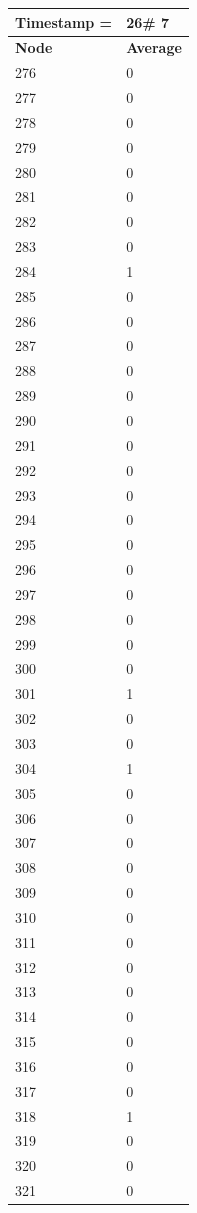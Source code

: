 \begin{tabular}{|l||l|}
\hline
\textbf{Timestamp =} & \textbf{26}\# 7\\\hline
	\textbf{Node} & \textbf{Average} \\ \hline
\hline
	276 & 0 \\ \hline
	277 & 0 \\ \hline
	278 & 0 \\ \hline
	279 & 0 \\ \hline
	280 & 0 \\ \hline
	281 & 0 \\ \hline
	282 & 0 \\ \hline
	283 & 0 \\ \hline
	284 & 1 \\ \hline
	285 & 0 \\ \hline
	286 & 0 \\ \hline
	287 & 0 \\ \hline
	288 & 0 \\ \hline
	289 & 0 \\ \hline
	290 & 0 \\ \hline
	291 & 0 \\ \hline
	292 & 0 \\ \hline
	293 & 0 \\ \hline
	294 & 0 \\ \hline
	295 & 0 \\ \hline
	296 & 0 \\ \hline
	297 & 0 \\ \hline
	298 & 0 \\ \hline
	299 & 0 \\ \hline
	300 & 0 \\ \hline
	301 & 1 \\ \hline
	302 & 0 \\ \hline
	303 & 0 \\ \hline
	304 & 1 \\ \hline
	305 & 0 \\ \hline
	306 & 0 \\ \hline
	307 & 0 \\ \hline
	308 & 0 \\ \hline
	309 & 0 \\ \hline
	310 & 0 \\ \hline
	311 & 0 \\ \hline
	312 & 0 \\ \hline
	313 & 0 \\ \hline
	314 & 0 \\ \hline
	315 & 0 \\ \hline
	316 & 0 \\ \hline
	317 & 0 \\ \hline
	318 & 1 \\ \hline
	319 & 0 \\ \hline
	320 & 0 \\ \hline
	321 & 0 \\ \hline
\end{tabular}
